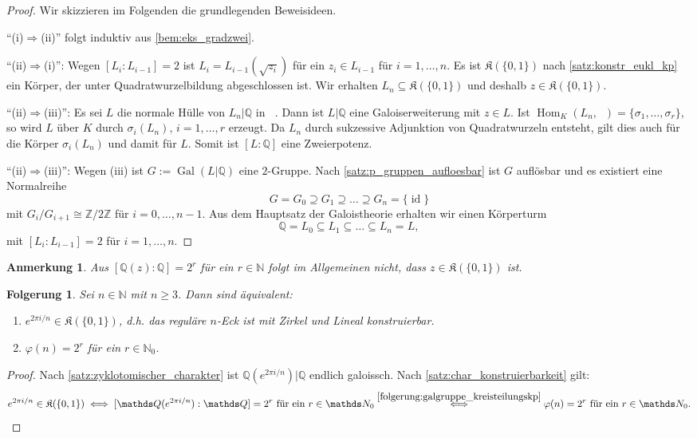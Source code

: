 \documentclass[a4paper, twoside, 11pt, ngerman]{report}
\newcommand{\NN}{\mathds N}
\newcommand{\QQ}{\mathds Q}
\newcommand{\ZZ}{\mathds Z}
\newcommand{\frakK}{\mathfrak K}
\DeclareMathOperator{\alg}{alg}
\DeclareMathOperator{\Gal}{Gal}
\DeclareMathOperator{\Hom}{Hom}
\DeclareMathOperator{\ident}{id}
\DeclareMathOperator{\QQalg}{\QQ^{\alg}}
\theoremstyle{definistyle}
\newtheorem{anm}[satz]{Anmerkung}
\newtheorem{folgerung}[satz]{Folgerung}
\theoremstyle{remark}
\begin{document}
\begin{proof}
Wir skizzieren im Folgenden die grundlegenden Beweisideen.

"`(i)$\Rightarrow$(ii)"' folgt induktiv aus \ref{bem:eks_gradzwei}.

"`(ii)$\Rightarrow$(i)"': Wegen $[L_i : L_{i-1}] = 2$ ist $L_i = L_{i-1}(\sqrt{z_i})$ für ein $z_i \in L_{i-1}$ für $i = 1, \dots, n$. Es ist $\frakK(\{0,1\})$ nach \ref{satz:konstr_eukl_kp} ein Körper, der unter Quadratwurzelbildung abgeschlossen ist.
Wir erhalten $L_n \subseteq \frakK(\{0,1\})$ und deshalb $z \in \frakK(\{0,1\})$.

"`(ii)$\Rightarrow$(iii)"': Es sei $L$ die normale Hülle von $L_n|\QQ$ in $\QQalg$. 
Dann ist $L|\QQ$ eine Galoiserweiterung mit $z \in L$.
Ist $\Hom_K(L_n,\QQalg)=\{\sigma_1,\ldots,\sigma_r\}$, so wird $L$ über $K$ durch $\sigma_i(L_n)$, $i=1,\ldots,r$ erzeugt. Da $L_n$ durch sukzessive Adjunktion von Quadratwurzeln entsteht, gilt dies auch für die Körper $\sigma_i(L_n)$ und damit für $L$.    
Somit ist $[L:\QQ]$ eine Zweierpotenz.

"`(ii)$\Rightarrow$(iii)"': Wegen (iii) ist $G := \Gal(L|\QQ)$ eine $2$-Gruppe. Nach 
\ref{satz:p_gruppen_aufloesbar} ist $G$ auflösbar und es existiert eine Normalreihe
\[
G = G_0 \supseteq G_1 \supseteq \dots \supseteq G_n = \{\ident\}
\]
mit $G_i / G_{i+1} \cong \ZZ / 2 \ZZ$ für $i = 0, \dots, n-1$.
Aus dem Hauptsatz der Galoistheorie erhalten wir einen  Körperturm 
\[
\QQ = L_0 \subseteq L_1 \subseteq \dots \subseteq L_n = L,
\]
mit $[L_i : L_{i-1}] = 2$ für $i = 1, \dots, n$.
\end{proof}

\begin{anm}
Aus $[\QQ(z) : \QQ] = 2^r$ für ein $r \in \NN$ folgt im Allgemeinen nicht, dass $z \in \frakK(\{0,1\})$ ist.
\end{anm}

\begin{folgerung}\label{folg:n_eck_konstr}
Sei $n \in \NN$ mit $n \geq 3$. Dann sind äquivalent:
\begin{enumerate}[label=(\roman*)]
    \item $e^{2\pi i / n} \in \frakK(\{0,1\})$, d.h. das reguläre $n$-Eck ist mit Zirkel und Lineal konstruierbar.
    \item $\varphi(n) = 2^r$ für ein $r \in \NN_0$.
\end{enumerate}
\end{folgerung}

\begin{proof}
Nach \ref{satz:zyklotomischer_charakter} ist $\QQ(e^{2\pi i / n}) | \QQ$ endlich galoissch.
Nach \ref{satz:char_konstruierbarkeit} gilt: 
\[
e^{2\pi i / n} \in \frakK(\{0,1\}) \iff [\QQ(e^{2\pi i / n}) : \QQ] = 2^r \text{ für ein } r \in \NN_0 \overset{\ref{folgerung:galgruppe_kreisteilungskp}}{\iff} \varphi(n)=2^r \text{ für ein } r \in \NN_0.
\]
\end{proof}
\end{document}
